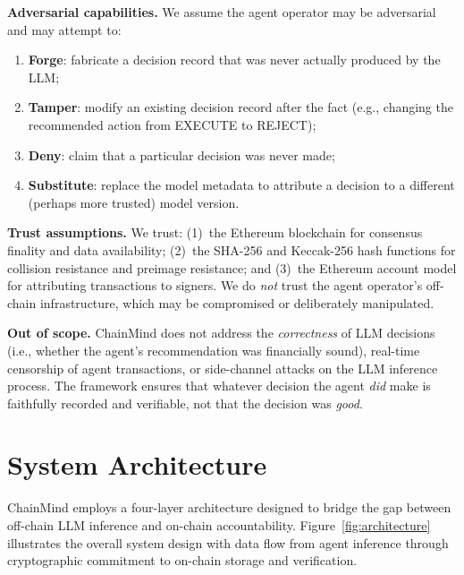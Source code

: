 \documentclass[manuscript,nonacm]{acmart}
\begin{document}
\textbf{Adversarial capabilities.}
We assume the agent operator may be adversarial and may attempt to:
\begin{enumerate}[label=(\alph*),leftmargin=*]
    \item \textbf{Forge}: fabricate a decision record that was never actually produced by the LLM;
    \item \textbf{Tamper}: modify an existing decision record after the fact (e.g., changing the recommended action from EXECUTE to REJECT);
    \item \textbf{Deny}: claim that a particular decision was never made;
    \item \textbf{Substitute}: replace the model metadata to attribute a decision to a different (perhaps more trusted) model version.
\end{enumerate}

\textbf{Trust assumptions.}
We trust: (1)~the Ethereum blockchain for consensus finality and data availability; (2)~the SHA-256 and Keccak-256 hash functions for collision resistance and preimage resistance; and (3)~the Ethereum account model for attributing transactions to signers.
We do \emph{not} trust the agent operator's off-chain infrastructure, which may be compromised or deliberately manipulated.

\textbf{Out of scope.}
ChainMind does not address the \emph{correctness} of LLM decisions (i.e., whether the agent's recommendation was financially sound), real-time censorship of agent transactions, or side-channel attacks on the LLM inference process.
The framework ensures that whatever decision the agent \emph{did} make is faithfully recorded and verifiable, not that the decision was \emph{good}.


\section{System Architecture}
\label{sec:architecture}

ChainMind employs a four-layer architecture designed to bridge the gap between off-chain LLM inference and on-chain accountability.
Figure~\ref{fig:architecture} illustrates the overall system design with data flow from agent inference through cryptographic commitment to on-chain storage and verification.
\end{document}
